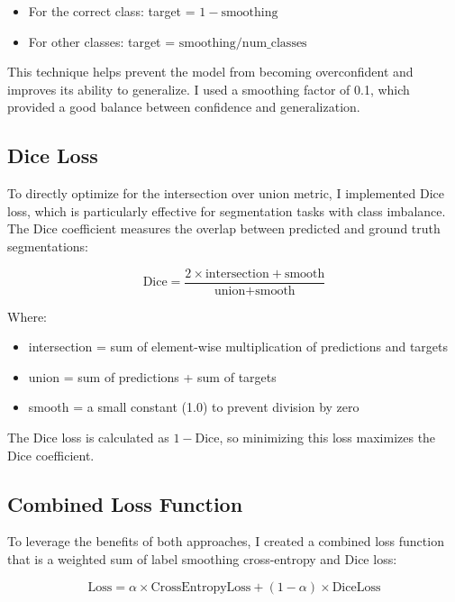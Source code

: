 \documentclass[]{article}
\begin{document}
\begin{itemize}
    \item For the correct class: target = $1 - \text{smoothing}$
    \item For other classes: target = $\text{smoothing} / \text{num\_classes}$
\end{itemize}

This technique helps prevent the model from becoming overconfident and improves its ability to generalize. I used a smoothing factor of 0.1, which provided a good balance between confidence and generalization.

\subsection{Dice Loss}
To directly optimize for the intersection over union metric, I implemented Dice loss, which is particularly effective for segmentation tasks with class imbalance. The Dice coefficient measures the overlap between predicted and ground truth segmentations:

\begin{equation}
\text{Dice} = \frac{2 \times \text{intersection} + \text{smooth}}{\text{union} + \text{smooth}}
\end{equation}

Where:
\begin{itemize}
    \item intersection = sum of element-wise multiplication of predictions and targets
    \item union = sum of predictions + sum of targets
    \item smooth = a small constant (1.0) to prevent division by zero
\end{itemize}

The Dice loss is calculated as $1 - \text{Dice}$, so minimizing this loss maximizes the Dice coefficient.

\subsection{Combined Loss Function}
To leverage the benefits of both approaches, I created a combined loss function that is a weighted sum of label smoothing cross-entropy and Dice loss:

\begin{equation}
\text{Loss} = \alpha \times \text{CrossEntropyLoss} + (1-\alpha) \times \text{DiceLoss}
\end{equation}
\end{document}
